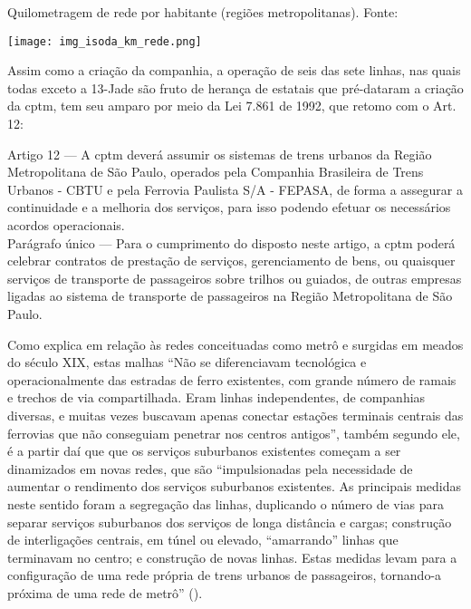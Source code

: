 \documentclass[11pt,fleqn]{book} %
\begin{document}
\begin{table}[h]
	\caption{Quilometragem de rede por habitante (regiões metropolitanas). Fonte: \cite[p. 58]{Isoda}}
	\texttt{[image: img\_isoda\_km\_rede.png]}
	\label{tab:isoda_km}
\end{table}

Assim como a criação da companhia, a operação de seis das sete linhas, nas quais todas exceto a 13-Jade são fruto de herança de estatais que pré-dataram a criação da {\glsdesc*{cptm}}, tem seu amparo por meio da Lei 7.861 de 1992, que retomo com o Art. 12:

\begin{citacao}
	Artigo 12 --- A \gls{cptm} deverá assumir os sistemas de trens urbanos da Região Metropolitana de São Paulo, operados pela Companhia Brasileira de Trens Urbanos - CBTU e pela Ferrovia Paulista S/A - FEPASA, de forma a assegurar a continuidade e a melhoria dos serviços, para isso podendo efetuar os necessários acordos operacionais.\\
	Parágrafo único --- Para o cumprimento do disposto neste artigo, a \gls{cptm} poderá celebrar contratos de prestação de serviços, gerenciamento de bens, ou quaisquer serviços de transporte de passageiros sobre trilhos ou guiados, de outras empresas ligadas ao sistema de transporte de passageiros na Região Metropolitana de São Paulo.\cite{lei7861}
\end{citacao}

Como explica \cite[pág. 30]{Isoda} em relação às redes conceituadas como metrô e surgidas em meados do século XIX, estas malhas ``Não se diferenciavam tecnológica e operacionalmente das estradas de ferro  existentes,  com  grande  número  de  ramais  e  trechos  de  via compartilhada. Eram linhas independentes, de companhias diversas, e muitas  vezes  buscavam  apenas  conectar  estações  terminais  centrais das ferrovias que não conseguiam penetrar nos centros antigos'', também segundo ele, é a partir daí que que os serviços suburbanos existentes começam a ser dinamizados em novas redes, que são ``impulsionadas  pela  necessidade  de  aumentar  o  rendimento  dos serviços  suburbanos  existentes.  As  principais  medidas  neste  sentido foram  a  segregação  das  linhas,  duplicando  o  número  de  vias  para separar serviços suburbanos dos serviços de longa distância e  cargas; construção  de  interligações  centrais,  em  túnel  ou  elevado, “amarrando” linhas que terminavam no centro; e construção de novas linhas. Estas medidas levam para a configuração de uma rede própria de trens urbanos de passageiros, tornando-a próxima de uma rede de metrô'' (\cite[pág. 32]{Isoda}).
	
\end{document}
